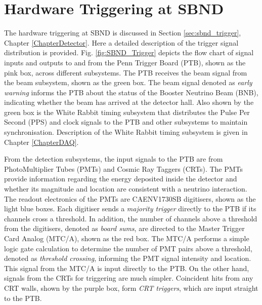 
\chapter{Hardware Triggering at SBND} 
\label{appendix_hardware_trigger}
\ifpdf
    \graphicspath{{Appendix1/Figs/Raster/}{Appendix1/Figs/PDF/}{Appendix1/Figs/}}
\else
    \graphicspath{{Appendix1/Figs/Vector/}{Appendix1/Figs/}}
\fi

The hardware triggering at SBND is discussed in Section \ref{sec:sbnd_trigger}, Chapter \ref{ChapterDetector}.
Here a detailed description of the trigger signal distribution is provided.
Fig. \ref{fig:SBND_Trigger} depicts the flow chart of signal inputs and outputs to and from the Penn Trigger Board (PTB), shown as the pink box, across different subsystems.  
The PTB receives the beam signal from the beam subsystem, shown as the green box.
The beam signal denoted as \textit{early warning} informs the PTB about the status of the Booster Neutrino Beam (BNB), indicating whether the beam has arrived at the detector hall.
Also shown by the green box is the White Rabbit timing subsystem that distributes the Pulse Per Second (PPS) and clock signals to the PTB and other subsystems to maintain synchronisation.
Description of the White Rabbit timing subsystem is given in Chapter \ref{ChapterDAQ}.

From the detection subsystems, the input signals to the PTB are from PhotoMultiplier Tubes (PMTs) and Cosmic Ray Taggers (CRTs).
The PMTs provide information regarding the energy deposited inside the detector and whether its magnitude and location are consistent with a neutrino interaction.
The readout electronics of the PMTs are CAENV1730SB digitisers, shown as the light blue boxes.
Each digitiser sends a \textit{majority trigger} directly to the PTB if its channels cross a threshold.
In addition, the number of channels above a threshold from the digitisers, denoted as \textit{board sums}, are directed to the Master Trigger Card Analog (MTC/A), shown as the red box.    
The MTC/A performs a simple logic gate calculation to determine the number of PMT pairs above a threshold, denoted as \textit{threshold crossing}, informing the PMT signal intensity and location.
This signal from the MTC/A is input directly to the PTB.  
On the other hand, signals from the CRTs for triggering are much simpler.
Coincident hits from any CRT walls, shown by the purple box, form \textit{CRT triggers}, which are input straight to the PTB.

